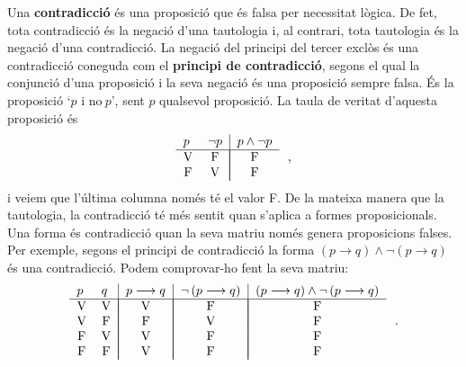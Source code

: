 Una \textbf{contradicci\'{o}} \'{e}s una proposici\'{o} que \'{e}s falsa per
necessitat l\`{o}gica. De fet, tota contradicci\'{o} \'{e}s la negaci\'{o}
d'una tautologia i, al contrari, tota tautologia \'{e}s la negaci\'{o} d'una
contradicci\'{o}. La negaci\'{o} del principi del tercer excl\`{o}s \'{e}s
una contradicci\'{o} coneguda com el \textbf{principi de contradicci\'{o}},
segons el qual la conjunci\'{o} d'una proposici\'{o} i la seva negaci\'{o}
\'{e}s una proposici\'{o} sempre falsa. \'{E}s la proposici\'{o} `$p$ i no$%
~p $', sent $p$ qualsevol proposici\'{o}. La taula de veritat d'aquesta
proposici\'{o} \'{e}s%
\begin{equation*}
\begin{tabular}{ll|l}
$p$ & $\lnot p$ & $p\wedge\lnot p$ \\ \hline
\multicolumn{1}{c}{V} & \multicolumn{1}{c|}{F} & \multicolumn{1}{|c}{F} \\
\multicolumn{1}{c}{F} & \multicolumn{1}{c|}{V} & \multicolumn{1}{|c}{F}%
\end{tabular}
\text{,}
\end{equation*}
i veiem que l'\'{u}ltima columna nom\'{e}s t\'{e} el valor F. De la mateixa
manera que la tautologia, la contradicci\'{o} t\'{e} m\'{e}s sentit quan
s'aplica a formes proposicionals. Una forma \'{e}s contradicci\'{o} quan la
seva matriu nom\'{e}s genera proposicions falses. Per exemple, segons el
principi de contradicci\'{o} la forma $\left( p\longrightarrow q\right)
\wedge\lnot\left( p\longrightarrow q\right) $ \'{e}s una contradicci\'{o}.
Podem comprovar-ho fent la seva matriu:%
\begin{equation*}
\begin{tabular}{ll|l|l|l}
$p$ & $q$ & $p\longrightarrow q$ & $\lnot\left( p\longrightarrow q\right) $
& $(p\longrightarrow q)\wedge\lnot\left( p\longrightarrow q\right) $ \\
\hline
\multicolumn{1}{c}{V} & \multicolumn{1}{c|}{V} & \multicolumn{1}{|c|}{V} &
\multicolumn{1}{|c|}{F} & \multicolumn{1}{|c}{F} \\
\multicolumn{1}{c}{V} & \multicolumn{1}{c|}{F} & \multicolumn{1}{|c|}{F} &
\multicolumn{1}{|c|}{V} & \multicolumn{1}{|c}{F} \\
\multicolumn{1}{c}{F} & \multicolumn{1}{c|}{V} & \multicolumn{1}{|c|}{V} &
\multicolumn{1}{|c|}{F} & \multicolumn{1}{|c}{F} \\
\multicolumn{1}{c}{F} & \multicolumn{1}{c|}{F} & \multicolumn{1}{|c|}{V} &
\multicolumn{1}{|c|}{F} & \multicolumn{1}{|c}{F}%
\end{tabular}
\text{.}
\end{equation*}

